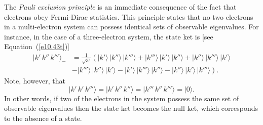 The {\em Pauli exclusion principle} is an immediate consequence of the fact that electrons obey Fermi-Dirac statistics. This principle 
states that no two electrons in a multi-electron system can possess identical sets of observable eigenvalues. For instance,
in the case of a three-electron system, the state ket is [see Equation~(\ref{e10.43t})]
\begin{align}
|k'\,k''\,k'''\rangle_- &= \frac{1}{\sqrt{3!}}\left(|k'\rangle\,|k''\rangle\,|k'''\rangle + |k'''\rangle\,|k'\rangle\,|k''\rangle+|k''\rangle\,|k'''\rangle\,|k'\rangle \right.\nonumber\\[0.5ex]
&\left.-|k'''\rangle\,|k''\rangle\,|k'\rangle - |k'\rangle\,|k'''\rangle\,|k''\rangle- |k''\rangle\,|k'\rangle\,|k'''\rangle\right).
\end{align}
Note, however, that
\begin{equation}
|k'\,k'\,k'''\rangle = |k'\,k''\,k''\rangle = |k'''\,k''\,k'''\rangle = |0\rangle.
\end{equation}
In other words, if two of the electrons in the system possess the same set of observable eigenvalues then the state ket becomes the null ket, which corresponds to
the absence of a state. 

